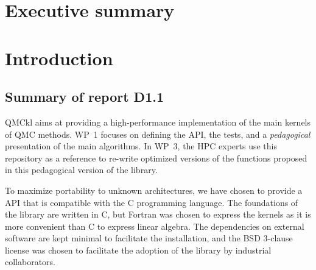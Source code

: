 \newcommand{\orgmode}{\texttt{org-mode}}
\newcommand{\Makefile}{\texttt{Makefile}}
\newcommand{\context}{\texttt{context}}
\newcommand{\CC}{C\nolinebreak\hspace{-.05em}\raisebox{.4ex}{\tiny\bf +}\nolinebreak\hspace{-.10em}\raisebox{.4ex}{\tiny\bf +}}
\def\CC{{C\nolinebreak[4]\hspace{-.05em}\raisebox{.4ex}{\tiny\bf ++}}}

\section{Executive summary}



\section{Introduction}

\subsection{Summary of report D1.1}

\Ac{QMCkl} aims at providing a high-performance
implementation of the main kernels of \ac{QMC} methods. 
\ac{WP}~1 focuses on defining the \ac{API}, the tests,
and a \emph{pedagogical} presentation of the main algorithms.
In \ac{WP}~3, the \ac{HPC} experts use this repository as a reference to re-write
optimized versions of the functions proposed in this pedagogical version of the library.

To maximize portability to unknown architectures, we have chosen to provide a \ac{API} that
is compatible with the C programming language. The foundations of the library are written in C, but Fortran
was chosen to express the kernels as it is more convenient than C to express linear algebra.
The dependencies on external software are kept minimal to facilitate the installation, and the
BSD 3-clause license was chosen to facilitate the adoption of the library by industrial 
collaborators.

